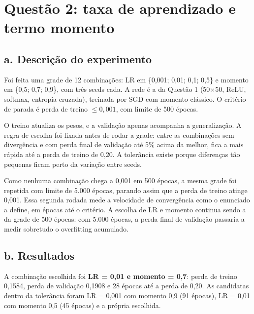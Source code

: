 \section{Questão 2: taxa de aprendizado e termo momento}

\subsection*{a. Descrição do experimento}

Foi feita uma grade de 12 combinações: LR em \{0,001; 0,01; 0,1; 0,5\} e momento em \{0,5; 0,7; 0,9\}, com três seeds cada.
A rede é a da Questão 1 (50$\times$50, ReLU, softmax, entropia cruzada), treinada por SGD com momento clássico. O critério de
parada é perda de treino $\le 0{,}001$, com limite de 500 épocas.

O treino atualiza os pesos, e a validação apenas acompanha a generalização. A regra de escolha foi fixada antes de rodar a grade:
entre as combinações sem divergência e com perda final de validação até 5\% acima da melhor, fica a mais rápida até a perda de
treino de 0,20. A tolerância existe porque diferenças tão pequenas ficam perto da variação entre seeds.

Como nenhuma combinação chega a 0,001 em 500 épocas, a mesma grade foi repetida com limite de 5.000 épocas, parando assim que a perda
de treino atinge 0,001. Essa segunda rodada mede a velocidade de convergência como o enunciado a define, em épocas até o critério.
A escolha de LR e momento continua sendo a da grade de 500 épocas: com 5.000 épocas, a perda final de validação passaria a medir
sobretudo o overfitting acumulado.

\subsection*{b. Resultados}


A combinação escolhida foi \textbf{LR = 0,01 e momento = 0,7}: perda de treino 0,1584, perda de validação 0,1908 e 28 épocas
até a perda de 0,20. As candidatas dentro da tolerância foram LR = 0,001 com momento 0,9 (91 épocas), LR = 0,01 com momento 0,5
(45 épocas) e a própria escolhida.


